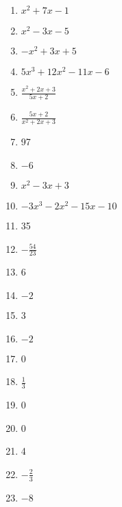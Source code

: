 \begin{enumerate}
	\item $x^2+7x-1$
    \item $x^2-3x-5$
    \item $-x^2+3x+5$
    \item $5x^3+12x^2-11x-6$
    \item $\frac{x^2+2x+3}{5x+2}$
    \item $\frac{5x+2}{x^2+2x+3}$
    \item 97
    \item $-6$
    \item $x^2-3x+3$
    \item $-3x^3-2x^2-15x-10$
    \item 35
    \item $-\frac{54}{23}$
    \item 6
    \item $-2$
    \item 3
    \item $-2$
    \item 0
    \item $\frac{1}{3}$
    \item 0
    \item 0
    \item 4
    \item $-\frac{2}{3}$
    \item $-8$
\end{enumerate}